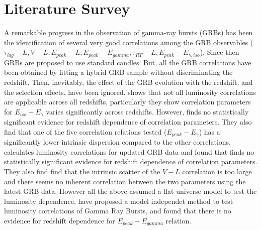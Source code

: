 \section{Literature Survey}
A remarkable progress in the observation of gamma-ray bursts (GRBs) has been the identification of several very good correlations among the GRB observables ($\tau_{lag} - L, V - L, E_{peak} - L, E_{peak} - E_{gamma}, \tau_{RT} - L, E_{peak} - E_{\gamma,iso}$)\cite{schaefer2007hubble}. Since then GRBs are proposed to use standard candles. But, all the GRB correlations have been obtained by fitting a hybrid GRB sample without discriminating the redshift. Then, inevitably, the effect of the GRB evolution with the redshift, and the selection effects, have been ignored. \cite{li2007variation} shows that not all luminosity correlations are applicable across all redshifts, particularly they show correlation parameters for $E_{iso}-E_{\gamma}$ varies significantly across redshifts. However, \cite{basilakos2008testing} finds no statistically significant evidence for redshift dependence of correlation parameters. They also find that one of the five correlation relations tested ($E_{peak}-E_{\gamma}$) has a significantly lower intrinsic dispersion compared to the other correlations. \cite{wang2011updated} calculates luminosity correlations for updated GRB data and found that finds no statistically significant evidence for redshift dependence of correlation parameters. They also find  find that the intrinsic scatter of the $V-L$ correlation is too large and there seems no inherent correlation between the two parameters using the latest GRB data. However all the above assumed a flat universe model to test the luminosity dependence. \cite{tang2021model} have proposed a model independet method to test luminosity correlations of Gamma Ray Bursts, and found that there is no evidence for redshift dependence for $E_{peak}-E_{gamma}$ relation.
